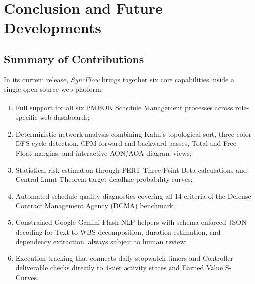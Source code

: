 \chapter{Conclusion and Future Developments}
\section{Summary of Contributions}
In its current release, \textit{SyncFlow} brings together six core capabilities inside a single open-source web platform:
\begin{enumerate}[leftmargin=*,itemsep=0.5pt,topsep=1pt,parsep=0pt,partopsep=0pt]
    \item Full support for all six PMBOK\textsuperscript{\textregistered} Schedule Management processes across role-specific web dashboards;
    
    \vspace{1mm}
    
    \item Deterministic network analysis combining Kahn's topological sort, three-color DFS cycle detection, CPM forward and backward passes, Total and Free Float margins, and interactive AON/AOA diagram views;
    
    \vspace{1mm}
    
    \item Statistical risk estimation through PERT Three-Point Beta calculations and Central Limit Theorem target-deadline probability curves;
    
    \vspace{1mm}
    
    \item Automated schedule quality diagnostics covering all 14 criteria of the Defense Contract Management Agency (DCMA) benchmark;
    
    \vspace{1mm}
    
    \item Constrained Google Gemini Flash NLP helpers with schema-enforced JSON decoding for Text-to-WBS decomposition, duration estimation, and dependency extraction, always subject to human review;
    
    \vspace{1mm}
    
    \item Execution tracking that connects daily stopwatch timers and Controller deliverable checks directly to 4-tier activity states and Earned Value S-Curves.
\end{enumerate}

